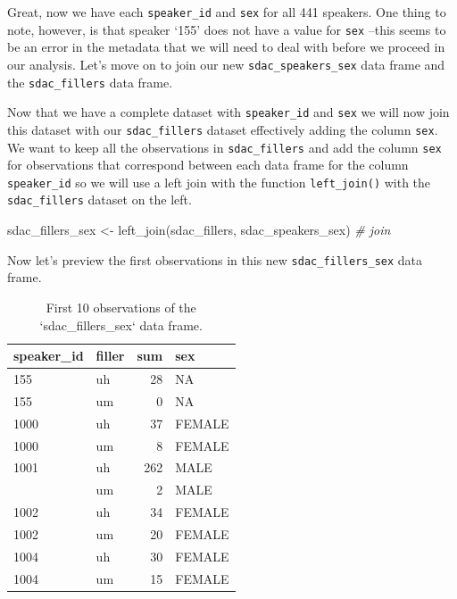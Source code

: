 \documentclass[
]{article}
\newenvironment{Shaded}{\begin{snugshade}}{\end{snugshade}}
\newcommand{\CommentTok}[1]{\textcolor[rgb]{0.56,0.35,0.01}{\textit{#1}}}
\newcommand{\FunctionTok}[1]{\textcolor[rgb]{0.00,0.00,0.00}{#1}}
\newcommand{\NormalTok}[1]{#1}
\newcommand{\OtherTok}[1]{\textcolor[rgb]{0.56,0.35,0.01}{#1}}
\begin{document}
Great, now we have each \texttt{speaker\_id} and \texttt{sex} for all 441 speakers. One thing to note, however, is that speaker `155' does not have a value for \texttt{sex} --this seems to be an error in the metadata that we will need to deal with before we proceed in our analysis. Let's move on to join our new \texttt{sdac\_speakers\_sex} data frame and the \texttt{sdac\_fillers} data frame.

Now that we have a complete dataset with \texttt{speaker\_id} and \texttt{sex} we will now join this dataset with our \texttt{sdac\_fillers} dataset effectively adding the column \texttt{sex}. We want to keep all the observations in \texttt{sdac\_fillers} and add the column \texttt{sex} for observations that correspond between each data frame for the column \texttt{speaker\_id} so we will use a left join with the function \texttt{left\_join()} with the \texttt{sdac\_fillers} dataset on the left.

\begin{Shaded}
\begin{Highlighting}[]
\NormalTok{sdac\_fillers\_sex }\OtherTok{\textless{}{-}} \FunctionTok{left\_join}\NormalTok{(sdac\_fillers, sdac\_speakers\_sex)  }\CommentTok{\# join}
\end{Highlighting}
\end{Shaded}

Now let's preview the first observations in this new \texttt{sdac\_fillers\_sex} data frame.

\begin{table}

\caption{\label{tab:i-multi-cont-sdac-fillers-sex-preview}First 10 observations of the `sdac_fillers_sex` data frame.}
\centering
\begin{tabular}[t]{llrl}
\toprule
speaker\_id & filler & sum & sex\\
\midrule
155 & uh & 28 & NA\\
155 & um & 0 & NA\\
1000 & uh & 37 & FEMALE\\
1000 & um & 8 & FEMALE\\
1001 & uh & 262 & MALE\\
\addlinespace
1001 & um & 2 & MALE\\
1002 & uh & 34 & FEMALE\\
1002 & um & 20 & FEMALE\\
1004 & uh & 30 & FEMALE\\
1004 & um & 15 & FEMALE\\
\bottomrule
\end{tabular}
\end{table}
\end{document}
